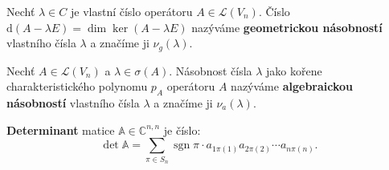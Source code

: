 \documentclass{szzclass}
\DeclareMathOperator{\sgn}{sgn}
\newcommand{\defect}[1]{\text{d} #1}
\begin{document}
\begin{definition}
Nechť $\lambda \in C$ je vlastní číslo operátoru $A \in \mathcal{L}(V_n)$. Číslo $\defect{(A -
\lambda E)} = \dim{\ker{(A-\lambda E)}}$ nazýváme \textbf{geometrickou násobností} vlastního čísla $\lambda$ 
a značíme ji $\nu_g(\lambda)$.
\end{definition}

\begin{definition}
Nechť $A \in \mathcal{L}(V_n)$ a $\lambda \in \sigma(A)$. Násobnost čísla $\lambda$ jako kořene charakteristického polynomu $p_A$ operátoru $A$ nazýváme \textbf{algebraickou násobností} vlastního čísla $\lambda$ a značíme ji $\nu_a(\lambda )$.
\end{definition}


\begin{definition}[determinant]
\textbf{Determinant} matice $\mathbb{A}\in \mathbb{C}^{n,n}$ je číslo:
\[
  \det{\mathbb{A}} = \sum_{\pi\in S_n} \sgn\pi \cdot a_{1\pi(1)} a_{2\pi(2)} \cdots a_{n\pi(n)}.
\]
\end{definition}
\end{document}
